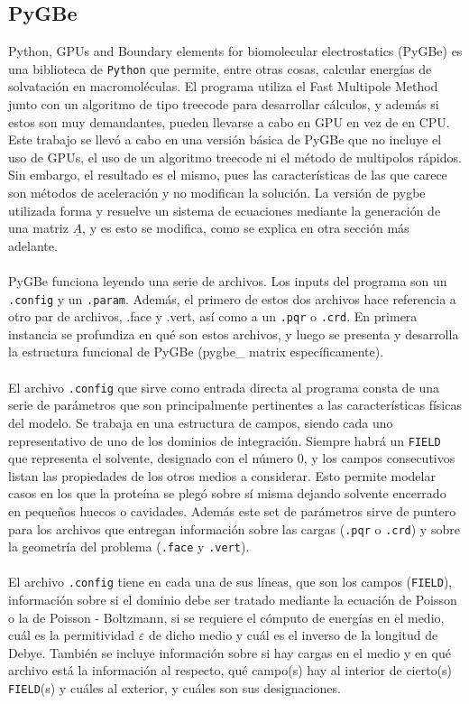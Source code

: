 \documentclass[12pt, oneside, numbers, spanish]{ezthesis}
\numberwithin{equation}{section}
\begin{document}
\subsection{PyGBe}
Python, GPUs and Boundary elements for biomolecular electrostatics (PyGBe) es una biblioteca de \texttt{Python} que permite, entre otras cosas, calcular energías de solvatación en macromoléculas. El programa utiliza el Fast Multipole Method junto con un algoritmo de tipo treecode para desarrollar cálculos, y además si estos son muy demandantes, pueden llevarse a cabo en GPU en vez de en CPU. Este trabajo se llevó a cabo en una versión básica de PyGBe que no incluye el uso de GPUs, el uso de un algoritmo treecode ni el método de multipolos rápidos. Sin embargo, el resultado es el mismo, pues las características de las que carece son métodos de aceleración y no modifican la solución. La versión de pygbe utilizada forma y resuelve un sistema de ecuaciones mediante la generación de una matriz $\underline{A}$, y es esto se modifica, como se explica en otra sección más adelante.\\\\
PyGBe funciona leyendo una serie de archivos. Los inputs del programa son un \texttt{.config} y un \texttt{.param}. Además, el primero de estos dos archivos hace referencia a otro par de archivos, .face y .vert, así como a un \texttt{.pqr} o \texttt{.crd}. En primera instancia se profundiza en qué son estos archivos, y luego se presenta y desarrolla la estructura funcional de PyGBe (pygbe\_ matrix específicamente).\\\\
El archivo \texttt{.config} que sirve como entrada directa al programa consta de una serie de parámetros que son principalmente pertinentes a las características físicas del modelo. Se trabaja en una estructura de campos, siendo cada uno representativo de uno de los dominios de integración. Siempre habrá un \texttt{FIELD} que representa el solvente, designado con el número 0, y los campos consecutivos listan las propiedades de los otros medios a considerar. Esto permite modelar casos en los que la proteína se plegó sobre sí misma dejando solvente encerrado en pequeños huecos o cavidades. Además este set de parámetros sirve de puntero para los archivos que entregan información sobre las cargas (\texttt{.pqr} o \texttt{.crd}) y sobre la geometría del problema (\texttt{.face} y \texttt{.vert}).\\\\
El archivo \texttt{.config} tiene en cada una de sus líneas, que son los campos (\texttt{FIELD}), información sobre si el dominio debe ser tratado mediante la ecuación de Poisson o la de Poisson - Boltzmann, si se requiere el cómputo de energías en el medio, cuál es la permitividad $\varepsilon$ de dicho medio y cuál es el inverso de la longitud de Debye. También se incluye información sobre si hay cargas en el medio y en qué archivo está la información al respecto, qué campo(s) hay al interior de cierto(s) \texttt{FIELD}(s) y cuáles al exterior, y cuáles son sus designaciones.\\\\
\end{document}
